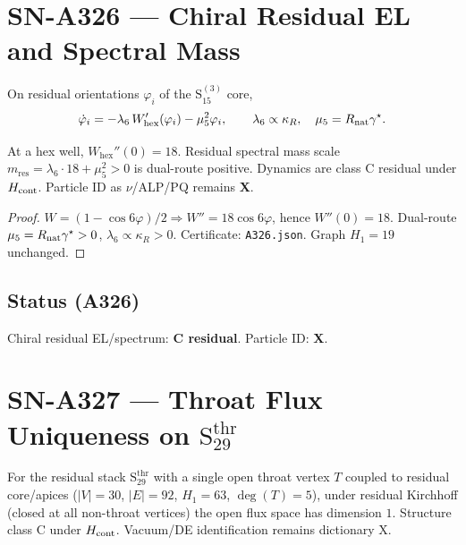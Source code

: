 \section{SN-A326 --- Chiral Residual EL and Spectral Mass}
\label{sec:SN-A326}

\begin{definition}
\label{def:A326-EL}
On residual orientations $\varphi_i$ of the $\mathrm{S}_{15}^{(3)}$ core,
\begin{equation}
\dot\varphi_i
=
-\lambda_6\,W_{\mathrm{hex}}'(\varphi_i)
-
\mu_5^2\varphi_i,
\qquad
\lambda_6\propto\kappa_R,
\quad
\mu_5=R_{\rm nat}\gamma^\star.
\end{equation}
\end{definition}

\begin{theorem}
\label{thm:A326}
At a hex well, $W_{\mathrm{hex}}''(0)=18$. Residual spectral mass scale $m_{\mathrm{res}}=\lambda_6\cdot 18+\mu_5^2>0$ is dual-route positive. Dynamics are class C residual under $H_{\rm cont}$. Particle ID as $\nu$/ALP/PQ remains \textbf{X}.
\end{theorem}

\begin{proof}
$W=(1-\cos 6\varphi)/2\Rightarrow W''=18\cos 6\varphi$, hence $W''(0)=18$. Dual-route $\mu_5=R_{\rm nat}\gamma^\star>0$, $\lambda_6\propto\kappa_R>0$. Certificate: \texttt{A326.json}. Graph $H_1=19$ unchanged.
\end{proof}

\subsection*{Status (A326)}
Chiral residual EL/spectrum: \textbf{C residual}. Particle ID: \textbf{X}.

\section{SN-A327 --- Throat Flux Uniqueness on $\mathrm{S}_{29}^{\mathrm{thr}}$}
\label{sec:SN-A327}

\begin{theorem}
\label{thm:A327}
For the residual stack $\mathrm{S}_{29}^{\mathrm{thr}}$ with a single open throat vertex $T$ coupled to residual core/apices ($|V|=30$, $|E|=92$, $H_1=63$, $\deg(T)=5$), under residual Kirchhoff (closed at all non-throat vertices) the open flux space has dimension $1$. Structure class C under $H_{\rm cont}$. Vacuum/DE identification remains dictionary X.
\end{theorem}

